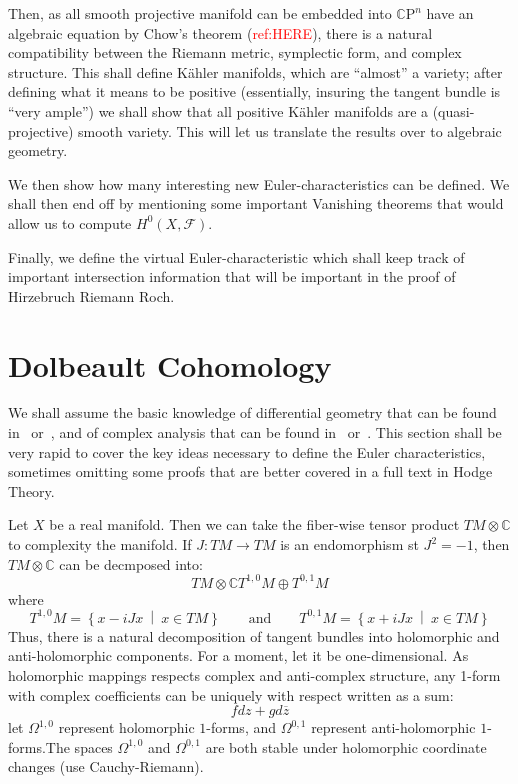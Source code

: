 \documentclass{book}
\newcommand{\C}{{\mathbb{C}}}
\newcommand{\CF}{{\mathcal{F}}}
\newcommand{\CP}{\mathbb{C}\mathrm{P}}
\newcommand{\set}[2]{\left\{#1 \ \middle|\ #2\right\}}
\begin{document}
Then, as all smooth projective manifold can be embedded into $\CP^n$ have an algebraic equation by Chow's
theorem (\textcolor{red}{ref:HERE}), there is a natural compatibility between the Riemann metric, symplectic
form, and complex structure. This shall define K\"ahler manifolds, which are ``almost'' a variety; after
defining what it means to be positive (essentially, insuring the tangent bundle is ``very ample'') we shall
show that all positive K\"ahler manifolds are a (quasi-projective) smooth variety. This will let us translate
the results over to algebraic geometry.

We then show how many interesting new Euler-characteristics can be
defined. We shall then end off by mentioning some important Vanishing theorems that would allow us to compute
$H^0(X, \CF)$.

Finally, we define the virtual Euler-characteristic which shall keep track of important intersection
information that will be important in the proof of Hirzebruch Riemann Roch.


\section{Dolbeault Cohomology}

We shall assume the basic knowledge of differential geometry that can be found in~\cite{NateDiffGeo}
or~\cite{leeIntroductionSmoothManifolds2003}, and of complex analysis that can be found
in~\cite{NateComplexAnalysis} or~\cite{ahlforsComplexAnalysisIntroduction2007}. This section shall be very
rapid to cover the key ideas necessary to define the Euler characteristics, sometimes omitting some proofs
that are better covered in a full text in Hodge Theory.

Let $X$ be a real manifold. Then we can take the fiber-wise tensor product $TM\otimes \C$ to complexity the
manifold. If $J: TM \to TM$ is an endomorphism st $J^2 = -1$, then $TM\otimes \C$ can be decmposed into:
\[
  TM\otimes \C T^{1,0}M \oplus T^{0,1}M
\]
where
\[
  T^{1,0}M = \set{x-iJx}{x \in TM} \qquad \text{and} \qquad T^{0,1}M =\set{x+iJx}{x \in TM}
\]
Thus, there is a natural decomposition of tangent bundles into holomorphic and anti-holomorphic components.
For a moment, let it be one-dimensional. As holomorphic mappings respects complex and anti-complex structure,
any 1-form with complex coefficients can be uniquely with respect written as a sum:
\[
   fdz + gd\overline{z}
\]
let $\Omega^{1,0}$ represent holomorphic $1$-forms, and $\Omega^{0,1}$ represent anti-holomorphic
$1$-forms.The spaces $\Omega^{1,0}$ and $\Omega^{0,1}$ are both stable under holomorphic coordinate
changes (use Cauchy-Riemann).
\end{document}
